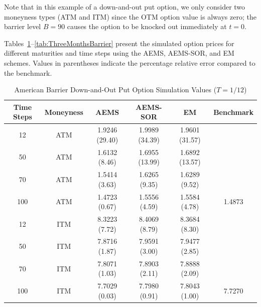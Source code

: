 \documentclass[graybox]{svmult}
\begin{document}
Note that in this example of a down-and-out put option, we only consider two moneyness types (ATM and ITM) since the OTM option value is always zero; the barrier level $B=90$ causes the option to be knocked out immediately at $t=0$.



Tables~\ref{tab:OneMonthBarrier}--\ref{tab:ThreeMonthsBarrier} present the simulated option prices for different maturities and time steps using the AEMS, AEMS-SOR, and EM schemes. Values in parentheses indicate the percentage relative error compared to the benchmark.





\begin{table}[H]
    \centering
    \caption{American Barrier Down-and-Out Put Option Simulation Values ($T=1/12$)}
    \label{tab:OneMonthBarrier}
    \setlength{\tabcolsep}{4.6pt} 
    \begin{tabular}{cccccc}
        \toprule
        \textbf{Time Steps} & \textbf{Moneyness} & \textbf{AEMS} & \textbf{AEMS-SOR} & \textbf{EM} & \textbf{Benchmark} \\
        \midrule
        12 & ATM & 1.9246 (29.40) & 1.9989 (34.39) & 1.9601 (31.57) &  \\
        50 & ATM & 1.6132 (8.46) & 1.6955 (13.99) & 1.6892 (13.57) \\
        70 & ATM & 1.5414 (3.63) & 1.6265 (9.35) & 1.6289 (9.52) \\
        100 & ATM & 1.4723 (0.67) & 1.5556 (4.59) & 1.5584 (4.78) & 1.4873 \\
        \midrule
        12 & ITM & 8.3223 (7.72) & 8.4069 (8.79) & 8.3684 (8.30) &  \\
        50 & ITM & 7.8716 (1.87) & 7.9591 (3.00) & 7.9477 (2.85) \\
        70 & ITM & 7.8071 (1.03) & 7.8903 (2.11) & 7.8888 (2.09) \\
        100 & ITM & 7.7029 (0.03) & 7.7980 (0.91) & 7.8043 (1.00) & 7.7270 \\
        \bottomrule
    \end{tabular}
\end{table}
\end{document}
